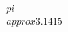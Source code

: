 \documentclass[preview]{standalone}
\begin{document}
\begin{align*}
\quad\\pi \quad\\approx 3.1415
\end{align*}
\end{document}
